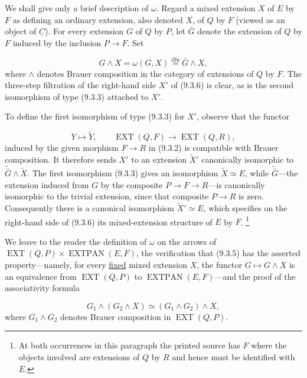 We shall give only a brief description of $\omega$. Regard a mixed
extension $X$ of $E$ by $F$ as defining an ordinary extension, also denoted
$X$, of $Q$ by $F$ (viewed as an object of $\underline C$). For every
extension $G$ of $Q$ by $P$, let $\bar G$ denote the extension of $Q$ by
$F$ induced by the inclusion $P\longrightarrow F$. Set

\begin{equation}\tag{9.3.6}
G\wedge X=\omega(G,X)
 \overset{\mathrm{dfn}}{=}\bar G\wedge X,
\end{equation}
where $\wedge$ denotes Brauer composition in the category of extensions of
$Q$ by $F$. The three-step filtration of the right-hand side $X'$ of
(9.3.6) is clear, as is the second isomorphism of type (9.3.3) attached to
$X'$.

To define the first isomorphism of type (9.3.3) for $X'$, observe that the
functor

\begin{equation*}
Y\longmapsto\widetilde Y,
\qquad
\operatorname{EXT}(Q,F)\longrightarrow\operatorname{EXT}(Q,R),
\end{equation*}
induced by the given morphism $F\longrightarrow R$ in (9.3.2) is
compatible with Brauer composition. It therefore sends $X'$ to an
extension $\widetilde X'$ canonically isomorphic to
$\widetilde{\bar G}\wedge\widetilde X$. The first isomorphism (9.3.3)
gives an isomorphism $\widetilde X\simeq E$, while
$\widetilde{\bar G}$---the extension induced from $G$ by the composite
$P\longrightarrow F\longrightarrow R$---is canonically isomorphic to the
trivial extension, since that composite $P\longrightarrow R$ is zero.
Consequently there is a canonical isomorphism
$\widetilde X'\simeq E$, which specifies on the right-hand side of (9.3.6)
its mixed-extension structure of $E$ by $F$.
\footnote{At both occurrences in this paragraph the printed source has
$F$ where the objects involved are extensions of $Q$ by $R$ and hence must
be identified with $E$.}

We leave to the reader the definition of $\omega$ on the arrows of
$\operatorname{EXT}(Q,P)\times\operatorname{EXTPAN}(E,F)$, the
verification that (9.3.5) has the asserted property---namely, for every
\underline{fixed} mixed extension $X$, the functor
$G\longmapsto G\wedge X$ is an equivalence from
$\operatorname{EXT}(Q,P)$ to $\operatorname{EXTPAN}(E,F)$---and the proof
of the associativity formula

\begin{equation}\tag{9.3.7}
G_1\wedge(G_2\wedge X)
 \simeq (G_1\wedge G_2)\wedge X,
\end{equation}
where $G_1\wedge G_2$ denotes Brauer composition in
$\operatorname{EXT}(Q,P)$.

